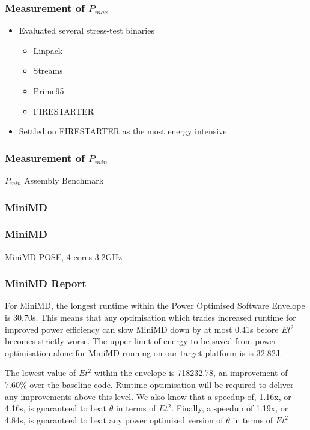 \documentclass{beamer}
\begin{document}
  \begin{frame}
    \frametitle{Measurement of $P_{max}$}
    \begin{itemize}
      \item Evaluated several stress-test binaries
      \begin{itemize}
        \item Linpack
        \item Streams
        \item Prime95
        \item FIRESTARTER
      \end{itemize}
      \item Settled on FIRESTARTER as the most energy intensive
    \end{itemize}
  \end{frame}

  \begin{frame}
    \frametitle{Measurement of $P_{min}$}
    \begin{block}{$P_{min}$ Assembly Benchmark}
      
    \end{block}
  \end{frame}

  \begin{frame}
    \frametitle{MiniMD}
    \begin{figure}
    \providecommand{\plotwidth}{.8\linewidth}
    
    \end{figure}
  \end{frame}
  \begin{frame}
    \frametitle{MiniMD}
    \begin{table}
    
    \caption{MiniMD POSE, 4 cores 3.2GHz}
    \end{table} 
  \end{frame}

  \begin{frame}
    \frametitle{MiniMD Report}
    For MiniMD, the longest runtime within the Power Optimised Software Envelope is 30.70s.
    This means that any optimisation which trades increased runtime for improved power efficiency can slow MiniMD down by at most 0.41s before $Et^2$ becomes strictly worse.
    The upper limit of energy to be saved from power optimisation alone for MiniMD running on our target platform is is 32.82J.

    The lowest value of $Et^2$ within the envelope is 718232.78, an improvement of 7.60\% over the baseline code. 
    Runtime optimisation will be required to deliver any improvements above this level.
    We also know that a speedup of, 1.16x, or 4.16s, is guaranteed to beat $\theta$ in terms of $Et^2$.
    Finally, a speedup of 1.19x, or 4.84s, is guaranteed to beat any power optimised version of $\theta$ in terms of $Et^2$
  \end{frame}
\end{document}
